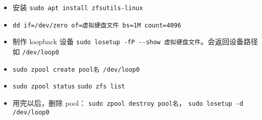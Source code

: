 
\begin{issues}
\issueDraft
\end{issues}

\begin{itemize}
\item 安装 \verb|sudo apt install zfsutils-linux|
\item \verb|dd if=/dev/zero of=虚拟硬盘文件 bs=1M count=4096|
\item 制作 loopback 设备 \verb|sudo losetup -fP --show 虚拟硬盘文件|。会返回设备路径如 \verb|/dev/loop0|
\item \verb|sudo zpool create pool名 /dev/loop0|
\item \verb|sudo zpool status| \verb|sudo zfs list|

\item 用完以后，删除 pool： \verb|sudo zpool destroy pool名|， \verb|sudo losetup -d /dev/loop0|
\end{itemize}
